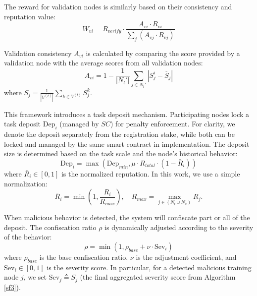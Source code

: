 \documentclass[a4paper]{cas-dc}
\begin{document}
The reward for validation nodes is similarly based on their consistency and reputation value:
\begin{equation}
	W_{vi} = R_{verify} \cdot \frac{A_{vi} \cdot R_{vi}}{\sum_j (A_{vj} \cdot R_{vj})}
\end{equation}

Validation consistency $A_{vi}$ is calculated by comparing the score provided by a validation node with the average scores from all validation nodes:
\begin{equation}
	A_{vi} = 1 - \frac{1}{|N_t'|} \sum_{j \in N_t'} |S_j^i - \overline{S}_j|
\end{equation}
where $\overline{S}_j = \frac{1}{|V^{(t)}|}\sum_{k \in V^{(t)}} S_j^k$.

This framework introduces a task deposit mechanism. Participating nodes lock a task deposit $\mathrm{Dep}_i$ (managed by $SC$) for penalty enforcement. For clarity, we denote the deposit separately from the registration stake, while both can be locked and managed by the same smart contract in implementation.
The deposit size is determined based on the task scale and the node's historical behavior:
\begin{equation}
	\mathrm{Dep}_i = \max(\mathrm{Dep}_{min}, \mu \cdot R_{total}\cdot(1 - \bar{R}_i))
\end{equation}
where $\bar{R}_i \in [0,1]$ is the normalized reputation. In this work, we use a simple normalization:
\begin{equation}
	\bar{R}_i = \min\left(1, \frac{R_i}{R_{max}}\right), \quad R_{max} = \max_{j \in (N_t \cup N_v)} R_j.
\end{equation}

When malicious behavior is detected, the system will confiscate part or all of the deposit. The confiscation ratio $\rho$ is dynamically adjusted according to the severity of the behavior:
\begin{equation}
	\rho = \min(1,\rho_{base} + \nu \cdot \mathrm{Sev}_i)
\end{equation}
where $\rho_{base}$ is the base confiscation ratio, $\nu$ is the adjustment coefficient, and $\mathrm{Sev}_i \in [0,1]$ is the severity score. In particular, for a detected malicious training node $j$, we set $\mathrm{Sev}_j \triangleq S_j$ (the final aggregated severity score from Algorithm \ref{sf3}).
\end{document}
